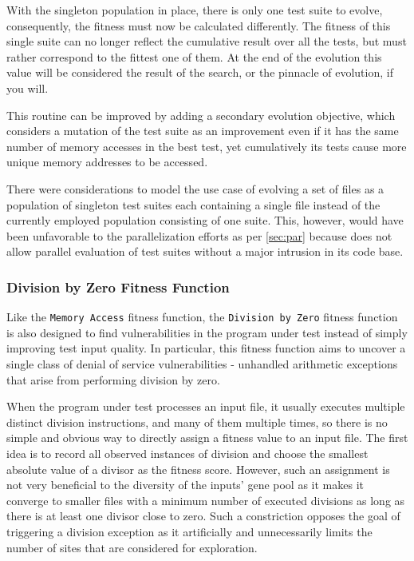 With the singleton population in place, there is only one test suite to evolve, consequently, the fitness
must now be calculated differently. The fitness of this single suite can no longer reflect the cumulative
result over all the tests, but must rather correspond to the fittest one of them. At the end of the
evolution this value will be considered the result of the search, or the pinnacle of evolution, if you will.

This routine can be improved by adding a secondary evolution objective, which considers a
mutation of the test suite as an improvement even if it has the same number of memory accesses in the best
test, yet cumulatively its tests cause more unique memory addresses to be accessed. 

There were considerations to model the use case of evolving a
set of files as a population of singleton test suites each containing a single file instead of the currently
employed population consisting of one suite. This, however, would have been unfavorable to the parallelization
efforts as per \cref{sec:par} because \evosuite does not allow parallel evaluation of test suites without a
major intrusion in its code base.
\subsubsection{Division by Zero Fitness Function}
Like the \texttt{Memory Access} fitness function, the \texttt{Division by Zero} fitness function is also
designed to find vulnerabilities in the program under test instead of simply improving test input quality. In
particular, this fitness function aims to uncover a single class of denial of service vulnerabilities -
unhandled arithmetic exceptions that arise from performing division by zero.

When the program under test processes an input file, it usually executes multiple distinct division
instructions, and many of them multiple times, so there is no simple and obvious way to directly assign a
fitness value to an input file. The first idea is to record all observed instances of division and choose the
smallest absolute value of a divisor as the fitness score. However, such an assignment is not very beneficial
to the diversity of the inputs' gene pool as it makes it converge to smaller files with a minimum number of
executed divisions as long as there is at least one divisor close to zero. Such a constriction opposes the
goal of triggering a division exception as it artificially and unnecessarily limits the number of sites
that are considered for exploration. 

